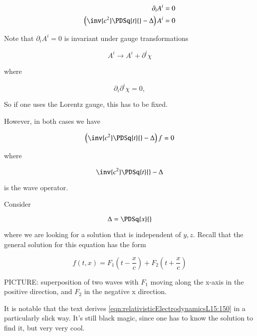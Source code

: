 \begin{align}\label{eqn:relativisticElectrodynamicsL15:30}
\partial_i A^i &= 0 \\
\left( \inv{c^2} \PDSq{t}{} - \Delta \right) A^i &= 0
\end{align}

Note that $\partial_i A^i = 0$ is invariant under gauge transformations

\begin{equation}\label{eqn:relativisticElectrodynamicsL15:50}
A^i \rightarrow A^i + \partial^i \chi
\end{equation}

where 

\begin{equation}\label{eqn:relativisticElectrodynamicsL15:70}
\partial_i \partial^i \chi = 0,
\end{equation}

So if one uses the Lorentz gauge, this has to be fixed.

However, in both cases we have 

\begin{equation}\label{eqn:relativisticElectrodynamicsL15:90}
\left( \inv{c^2} \PDSq{t}{} - \Delta \right) f = 0
\end{equation}

where 

\begin{equation}\label{eqn:relativisticElectrodynamicsL15:110}
\inv{c^2} \PDSq{t}{} - \Delta 
\end{equation}

is the wave operator.

Consider 

\begin{equation}\label{eqn:relativisticElectrodynamicsL15:130}
\Delta = \PDSq{x}{}
\end{equation}

where we are looking for a solution that is independent of $y, z$.  Recall that the general solution for this equation has the form

\begin{equation}\label{eqn:relativisticElectrodynamicsL15:150}
f(t, x) = 
F_1 \left(t - \frac{x}{c}\right)
+F_2 \left(t + \frac{x}{c}\right)
\end{equation}

PICTURE: superposition of two waves with $F_1$ moving along the x-axis in the positive direction, and $F_2$ in the negative x direction.

It is notable that the text derives \ref{eqn:relativisticElectrodynamicsL15:150} in a particularly slick way.  It's still black magic, since one has to know the solution to find it, but very very cool.

